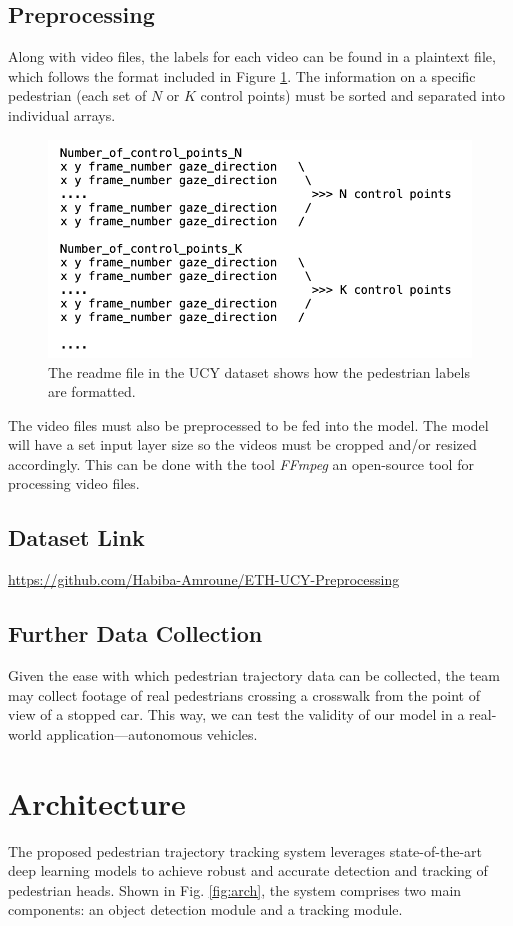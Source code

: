 \documentclass{article} %
\begin{document}
\subsection{Preprocessing}
Along with video files, the labels for each video can be found in a plaintext file, which follows the format included in Figure \ref{fig:enter-label}. The information on a specific pedestrian (each set of $N$ or $K$ control points) must be sorted and separated into individual arrays.
\begin{figure}[!h]
    \centering
    \includegraphics[width=0.5\linewidth]{Figs/read_me_ucy.png}
    \caption{The readme file in the UCY dataset shows how the pedestrian labels are formatted.}
    \label{fig:enter-label}
\end{figure}

The video files must also be preprocessed to be fed into the model. The model will have a set input layer size so the videos must be cropped and/or resized accordingly. This can be done with the tool \textit{FFmpeg} an open-source tool for processing video files.

\subsection{Dataset Link}

\url{https://github.com/Habiba-Amroune/ETH-UCY-Preprocessing}

\subsection{Further Data Collection}
Given the ease with which pedestrian trajectory data can be collected, the team may collect footage of real pedestrians crossing a crosswalk from the point of view of a stopped car. This way, we can test the validity of our model in a real-world application—autonomous vehicles. 

\section{Architecture}
The proposed pedestrian trajectory tracking system leverages state-of-the-art deep learning models to achieve robust and accurate detection and tracking of pedestrian heads. Shown in Fig. \ref{fig:arch}, the system comprises two main components: an object detection module and a tracking module.
\end{document}
